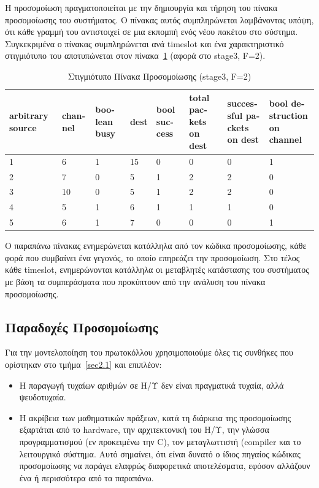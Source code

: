 \documentclass[12pt]{report}
\begin{document}
Η προσομοίωση πραγματοποιείται με την δημιουργία και τήρηση του πίνακα προσομοίωσης του συστήματος. Ο πίνακας αυτός συμπληρώνεται λαμβάνοντας υπόψη, ότι κάθε γραμμή του αντιστοιχεί σε μια εκπομπή ενός νέου πακέτου στο σύστημα. Συγκεκριμένα ο πίνακας συμπληρώνεται ανά \textlatin{timeslot} και ένα χαρακτηριστικό στιγμιότυπο του αποτυπώνεται στον πίνακα~\ref{tab01} (αφορά στο \textlatin{stage3, F=2}).

\begin{table}[h!]
\centering
\scriptsize
\begin{tabular}{||p{1cm}|p{1cm}|p{1cm}|p{1cm}|p{1cm}|p{1cm}|p{1cm}|p{1cm}||}
\hline
\textlatin{arbitrary source} & \textlatin{channel} & \textlatin{boolean busy} & \textlatin{dest} & \textlatin{bool success} & \textlatin{total packets on dest} & \textlatin{successful packets on dest} & \textlatin{bool destruction on channel} \\ [0.5ex]
\hline\hline
1 & 6  & 1 & 15 & 0 & 0 & 0 & 1\\ 
2 & 7  & 0 & 5  & 1 & 2 & 2 & 0\\
3 & 10 & 0 & 5  & 1 & 2 & 2 & 0\\
4 & 5  & 1 & 6  & 1 & 1 & 1 & 0\\
5 & 6  & 1 & 7  & 0 & 0 & 0 & 1\\ [1ex] 
\hline
\end{tabular}
\caption{Στιγμιότυπο Πίνακα Προσομοίωσης (\textlatin{stage3, F=2})}
\label{tab01}
\end{table}

Ο παραπάνω πίνακας ενημερώνεται κατάλληλα από τον κώδικα προσομοίωσης, κάθε φορά που συμβαίνει ένα γεγονός, το οποίο επηρεάζει την προσομοίωση. Στο τέλος κάθε \textlatin{timeslot}, ενημερώνονται κατάλληλα οι μεταβλητές κατάστασης του συστήματος με βάση τα συμπεράσματα που προκύπτουν από την ανάλυση του πίνακα προσομοίωσης.

\subsection{Παραδοχές Προσομοίωσης}
Για την μοντελοποίηση του πρωτοκόλλου χρησιμοποιούμε όλες τις συνθήκες που ορίστηκαν στο τμήμα~\ref{sec2.1} και επιπλέον:
\begin{itemize}
	\item Η παραγωγή τυχαίων αριθμών σε Η/Υ δεν είναι πραγματικά τυχαία, αλλά ψευδοτυχαία.
	\item Η ακρίβεια των μαθηματικών πράξεων, κατά τη διάρκεια της προσομοίωσης εξαρτάται από το \textlatin{hardware}, την αρχιτεκτονική του Η/Υ, την γλώσσα προγραμματισμού (εν προκειμένω την \textlatin{C}), τον μεταγλωττιστή (\textlatin{compiler} και το λειτουργικό σύστημα. Αυτό σημαίνει, ότι είναι δυνατό ο ίδιος πηγαίος κώδικας προσομοίωσης να παράγει ελαφρώς διαφορετικά αποτελέσματα, εφόσον αλλάζουν ένα ή περισσότερα από τα παραπάνω.
\end{itemize}
\end{document}
